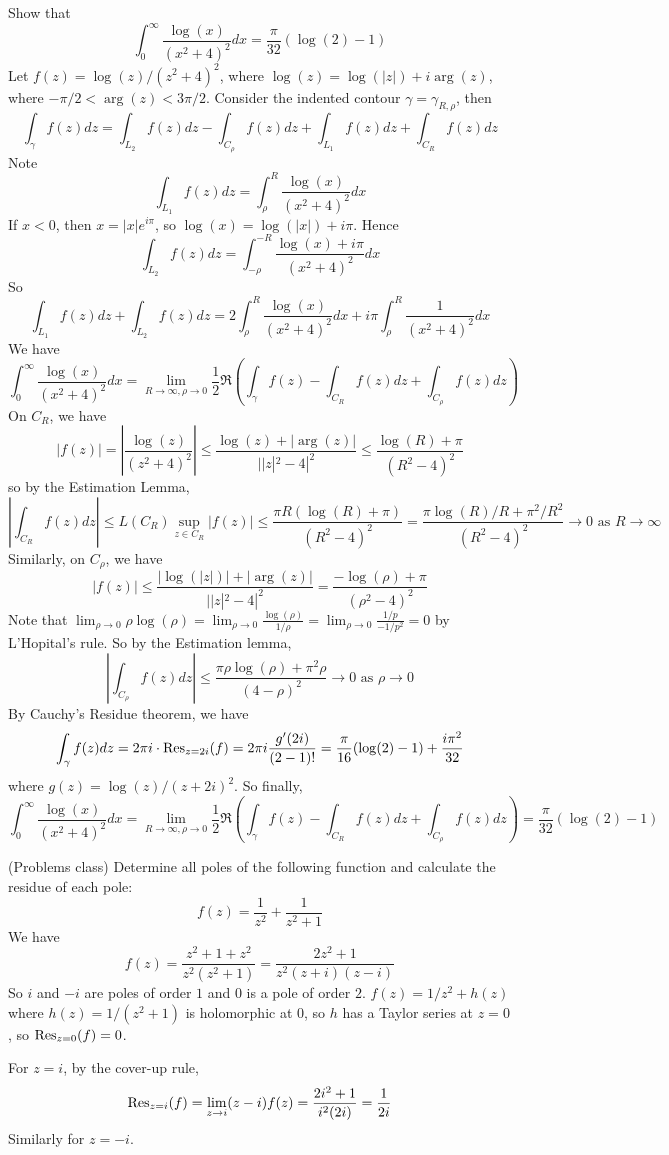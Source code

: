 \begin{example}
	Show that
	\[
		\int_{0}^{\infty} \frac{\log(x)}{{(x^2 + 4)}^2} dx = \frac{\pi}{32} (\log(2) - 1)
	\]
	Let $f(z) = \log(z) / {(z^2 + 4)}^2$, where $\log(z) = \log(|z|) + i \arg(z)$, where $-\pi / 2 < \arg(z) < 3\pi / 2$. Consider the indented contour $\gamma = \gamma_{R, \rho}$, then
	\[
		\int_{\gamma} f(z) dz = \int_{L_2} f(z) dz - \int_{C_{\rho}} f(z) dz + \int_{L_1} f(z) dz + \int_{C_R} f(z) dz
	\]
	Note
	\[
		\int_{L_1} f(z) dz = \int_{\rho}^{R} \frac{\log(x)}{{(x^2 + 4)}^2} dx
	\]
	If $x < 0$, then $x = |x| e^{i\pi}$, so $\log(x) = \log(|x|) + i \pi$. Hence
	\[
		\int_{L_2} f(z) dz = \int_{-\rho}^{-R} \frac{\log(x) + i \pi}{(x^2 + 4)^2} dx
	\]
	So
	\[
		\int_{L_1} f(z) dz + \int_{L_2} f(z) dz = 2 \int_{\rho}^{R} \frac{\log(x)}{{(x^2 + 4)}^2} dx + i \pi \int_{\rho}^{R} \frac{1}{(x^2 + 4)^2} dx
	\]
	We have
	\[
		\int_{0}^{\infty} \frac{\log(x)}{{(x^2 + 4)}^2} dx = \lim_{R \to \infty, \rho \to 0} \frac{1}{2} \Re \left( \int_{\gamma} f(z) - \int_{C_R} f(z) dz + \int_{C_{\rho}} f(z) dz \right)
	\]
	On $C_R$, we have
	\[
		|f(z)| = \left| \frac{\log(z)}{{(z^2 + 4)}^2} \right| \le \frac{\log(z) + |\arg(z)|}{||z|^2 - 4|^2} \le \frac{\log(R) + \pi}{{(R^2 - 4)}^2}
	\]
	so by the Estimation Lemma,
	\[
		\left| \int_{C_R} f(z) dz \right| \le L(C_R) \sup_{z \in C_R} |f(z)| \le \frac{\pi R (\log(R) + \pi)}{{(R^2 - 4)}^2} = \frac{\pi \log(R) / R + \pi^2 / R^2}{(R^2 - 4)^2} \to 0 \text{ as } R \to \infty
	\]
	Similarly, on $C_{\rho}$, we have
	\[
		|f(z)| \le \frac{|\log(|z|)| + |\arg(z)|}{||z|^2 - 4|^2} = \frac{-\log(\rho) + \pi}{{(\rho^2 - 4)}^2}
	\]
	Note that $\lim_{\rho \to 0} \rho \log(\rho) = \lim_{\rho \to 0} \frac{\log(\rho)}{1 / \rho} = \lim_{\rho \to 0} \frac{1/p}{-1/p^2} = 0$ by L'Hopital's rule. So by the Estimation lemma,
	\[
		\left| \int_{C_{\rho}} f(z) dz \right| \le \frac{\pi \rho \log(\rho) + \pi^2 \rho}{{(4 - \rho)}^2} \to 0 \text{ as } \rho \to 0
	\]
	By Cauchy's Residue theorem, we have
	\[
		\int_{\gamma} f(z) dz = 2 \pi i \cdot \text{Res}_{z = 2i} (f) = 2\pi i \frac{g'(2i)}{(2 - 1)!} = \frac{\pi}{16} (\log(2) - 1) + \frac{i\pi^2}{32}
	\]
	where $g(z) = \log(z) / {(z + 2i)}^2$. So finally,
	\[
		\int_{0}^{\infty} \frac{\log(x)}{{(x^2 + 4)}^2} dx = \lim_{R \to \infty, \rho \to 0} \frac{1}{2} \Re \left( \int_{\gamma} f(z) - \int_{C_R} f(z) dz + \int_{C_{\rho}} f(z) dz \right) = \frac{\pi}{32} (\log(2) - 1)
	\]
\end{example}

\begin{example}
	(Problems class) Determine all poles of the following function and calculate the residue of each pole:
	\[
		f(z) = \frac{1}{z^2} + \frac{1}{z^2 + 1}
	\]
	We have
	\[
		f(z) = \frac{z^2 + 1 + z^2}{z^2 (z^2 + 1)} = \frac{2z^2 + 1}{z^2 (z + i)(z - i)}
	\]
	So $i$ and $-i$ are poles of order $1$ and $0$ is a pole of order $2$. $f(z) = 1/z^2 + h(z)$ where $h(z) = 1/(z^2 + 1)$ is holomorphic at $0$, so $h$ has a Taylor series at $z = 0$, so $\text{Res}_{z = 0}(f) = 0$.

	For $z = i$, by the cover-up rule,
	\[
		\text{Res}_{z = i}(f) = \lim_{z \to i} (z - i) f(z) = \frac{2i^2 + 1}{i^2 (2i)} = \frac{1}{2i}
	\]
	Similarly for $z = -i$.
\end{example}


